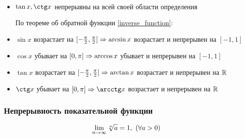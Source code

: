 \begin{corollary}~
	\begin{itemize}
		\item $\tan x, \ctg x$ непрерывны на всей своей области определения
		
		По теореме об обратной функции \ref{inverse_function}:
		
		\item $\sin x$ возрастает на $[-\frac{\pi}{2}, \frac{\pi}{2}] \Rightarrow \arcsin x$ возрастает и непрерывен на $[-1, 1]$
		
		\item $\cos x$ убывает на $[0, \pi] \Rightarrow \arccos x$ убывает и непрерывен на $[-1, 1]$
		
		\item $\tan x$ возрастает на $[-\frac{\pi}{2}, \frac{\pi}{2}] \Rightarrow \arctan x$ возрастает и непрерывен на $\mathbb{R}$
		
		\item $\ctg x$ убывает на $[0, \pi] \Ra \arcctg x$ возрастает и непрерывен на $\mathbb{R}$
	\end{itemize}
\end{corollary}



\subsubsection*{Непрерывность показательной функции}

\begin{lemma}
	\[
		\liml_{n \to \infty} \sqrt[n]{a} = 1,\ (\forall a > 0)
	\]
\end{lemma}

